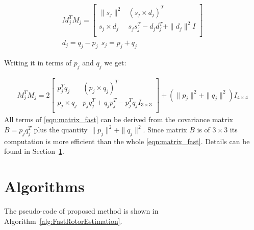 \documentclass{birkjour}
\numberwithin{equation}{section}
\begin{document}
\begin{eqnarray*}
	M_j^T M_j = 
	\left[\begin{array}{cc}
		\| s_j \|^2        &         (s_j \times d_j)^T \\
		s_j \times d_j  &    s_j s_j^T - d_j d_j^T + \| d_j \|^2 I \\
	\end{array}\right]\\
	d_j = q_j - p_j \ \ s_j = p_j + q_j
\end{eqnarray*}

Writing it in terms of $p_j$ and $q_j$ we get:

\begin{eqnarray}
   \label{eqn:matrix_fast}
   	M_j^T M_j = 2
	\left[\begin{array}{cc}
		p_j^T q_j       &         (p_j \times q_j)^T \\
		p_j \times q_j  &    p_j q_j^T + q_j p_j^T - p_j^Tq_j I_{3\times3} \\
	\end{array}\right]
    + (\| p_j \|^2 + \| q_j \|^2) I_{4\times4}
\end{eqnarray}
All terms of \ref{eqn:matrix_fast} can be derived from the covariance matrix $B = p_j q_j^T$ plus the quantity $\| p_j \|^2 + \| q_j \|^2$. Since matrix $B$ is of $3\times3$ its computation is more efficient than the whole \ref{eqn:matrix_fast}. Details can be found in Section~\ref{section:algoritms}.

\section{Algorithms}
\label{section:algoritms}

The pseudo-code of proposed method is shown in Algorithm~\ref{alg:FastRotorEstimation}. 
\end{document}

